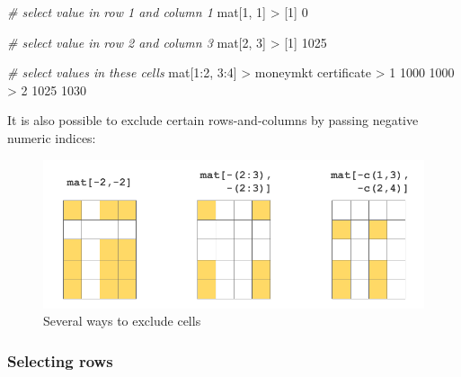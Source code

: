 \documentclass[
]{book}
\newenvironment{Shaded}{\begin{snugshade}}{\end{snugshade}}
\newcommand{\CommentTok}[1]{\textcolor[rgb]{0.56,0.35,0.01}{\textit{#1}}}
\newcommand{\DecValTok}[1]{\textcolor[rgb]{0.00,0.00,0.81}{#1}}
\newcommand{\NormalTok}[1]{#1}
\newcommand{\SpecialCharTok}[1]{\textcolor[rgb]{0.00,0.00,0.00}{#1}}
\begin{document}
\begin{Shaded}
\begin{Highlighting}[]
\CommentTok{\# select value in row 1 and column 1}
\NormalTok{mat[}\DecValTok{1}\NormalTok{, }\DecValTok{1}\NormalTok{]}
\SpecialCharTok{\textgreater{}}\NormalTok{ [}\DecValTok{1}\NormalTok{] }\DecValTok{0}

\CommentTok{\# select value in row 2 and column 3}
\NormalTok{mat[}\DecValTok{2}\NormalTok{, }\DecValTok{3}\NormalTok{]}
\SpecialCharTok{\textgreater{}}\NormalTok{ [}\DecValTok{1}\NormalTok{] }\DecValTok{1025}

\CommentTok{\# select values in these cells}
\NormalTok{mat[}\DecValTok{1}\SpecialCharTok{:}\DecValTok{2}\NormalTok{, }\DecValTok{3}\SpecialCharTok{:}\DecValTok{4}\NormalTok{]}
\SpecialCharTok{\textgreater{}}\NormalTok{   moneymkt certificate}
\SpecialCharTok{\textgreater{}} \DecValTok{1}     \DecValTok{1000}        \DecValTok{1000}
\SpecialCharTok{\textgreater{}} \DecValTok{2}     \DecValTok{1025}        \DecValTok{1030}
\end{Highlighting}
\end{Shaded}

It is also possible to exclude certain rows-and-columns by passing negative
numeric indices:

\begin{figure}

{\centering \includegraphics[width=0.8\linewidth]{images/objects/obj-matrix-cells2} 

}

\caption{Several ways to exclude cells}\label{fig:unnamed-chunk-128}
\end{figure}

\hypertarget{selecting-rows}{%
\subsubsection*{Selecting rows}\label{selecting-rows}}
\end{document}
